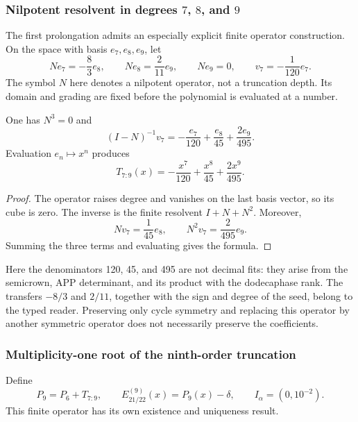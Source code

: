 \subsubsection{Nilpotent resolvent in degrees \(7\), \(8\), and \(9\)}
\label{subsec:alpha-resolvente}

The first prolongation admits an especially explicit finite
operator construction. On the space with basis \(e_7,e_8,e_9\),
let
\[
 Ne_7=-\frac83e_8,\qquad Ne_8=\frac2{11}e_9,\qquad Ne_9=0,
 \qquad v_7=-\frac1{120}e_7.
\]
The symbol \(N\) here denotes a nilpotent operator, not a truncation
depth. Its domain and grading are fixed before the polynomial
is evaluated at a number.

\begin{lemma}
\label{lem:alpha-resolvente}
One has \(N^3=0\) and
\[
 (I-N)^{-1}v_7
 =-\frac{e_7}{120}+\frac{e_8}{45}+\frac{2e_9}{495}.
\]
Evaluation \(e_n\mapsto x^n\) produces
\begin{equation}
 T_{7:9}(x)=-\frac{x^7}{120}+\frac{x^8}{45}+\frac{2x^9}{495}.
 \label{eq:alpha-t79}
\end{equation}
\end{lemma}

\begin{proof}
The operator raises degree and vanishes on the last basis vector,
so its cube is zero. The inverse is the finite resolvent
\(I+N+N^2\). Moreover,
\[
 Nv_7=\frac1{45}e_8,\qquad N^2v_7=\frac2{495}e_9.
\]
Summing the three terms and evaluating gives the formula.
\end{proof}

Here the denominators 120, 45, and 495 are not decimal fits: they arise
from the semicrown, APP determinant, and its product with the dodecaphase
rank. The transfers \(-8/3\) and \(2/11\), together with the
sign and degree of the seed, belong to the typed reader. Preserving
only cycle symmetry and replacing this operator by another symmetric
operator does not necessarily preserve the coefficients.

\subsubsection{Multiplicity-one root of the ninth-order truncation}
\label{subsec:alpha-jet}

Define
\[
 P_9=P_6+T_{7:9},\qquad E_{21/22}^{(9)}(x)=P_9(x)-\delta,
 \qquad I_\alpha=(0,10^{-2}).
\]
This finite operator has its own existence and uniqueness result.

